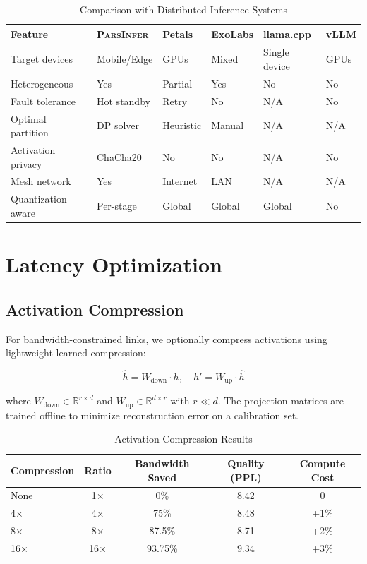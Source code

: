 \documentclass[11pt,a4paper]{article}
\newcommand{\parsdi}{\textsc{ParsInfer}\xspace}
\newcommand{\RR}{\mathbb{R}}
\begin{document}
\begin{table}[H]
\centering
\caption{Comparison with Distributed Inference Systems}
\label{tab:comparison}
\begin{tabularx}{\textwidth}{lXXXXX}
\toprule
\textbf{Feature} & \textbf{\parsdi} & \textbf{Petals} & \textbf{ExoLabs} & \textbf{llama.cpp} & \textbf{vLLM} \\
\midrule
Target devices & Mobile/Edge & GPUs & Mixed & Single device & GPUs \\
Heterogeneous & Yes & Partial & Yes & No & No \\
Fault tolerance & Hot standby & Retry & No & N/A & No \\
Optimal partition & DP solver & Heuristic & Manual & N/A & N/A \\
Activation privacy & ChaCha20 & No & No & N/A & No \\
Mesh network & Yes & Internet & LAN & N/A & N/A \\
Quantization-aware & Per-stage & Global & Global & Global & No \\
\bottomrule
\end{tabularx}
\end{table}

\section{Latency Optimization}

\subsection{Activation Compression}

For bandwidth-constrained links, we optionally compress activations using lightweight learned compression:

\begin{equation}
    \hat{h} = W_{\text{down}} \cdot h, \quad h' = W_{\text{up}} \cdot \hat{h}
\end{equation}

where $W_{\text{down}} \in \RR^{r \times d}$ and $W_{\text{up}} \in \RR^{d \times r}$ with $r \ll d$. The projection matrices are trained offline to minimize reconstruction error on a calibration set.

\begin{table}[H]
\centering
\caption{Activation Compression Results}
\label{tab:act-compress}
\begin{tabular}{lcccc}
\toprule
\textbf{Compression} & \textbf{Ratio} & \textbf{Bandwidth Saved} & \textbf{Quality (PPL)} & \textbf{Compute Cost} \\
\midrule
None & 1$\times$ & 0\% & 8.42 & 0 \\
4$\times$ & 4$\times$ & 75\% & 8.48 & +1\% \\
8$\times$ & 8$\times$ & 87.5\% & 8.71 & +2\% \\
16$\times$ & 16$\times$ & 93.75\% & 9.34 & +3\% \\
\bottomrule
\end{tabular}
\end{table}
\end{document}
